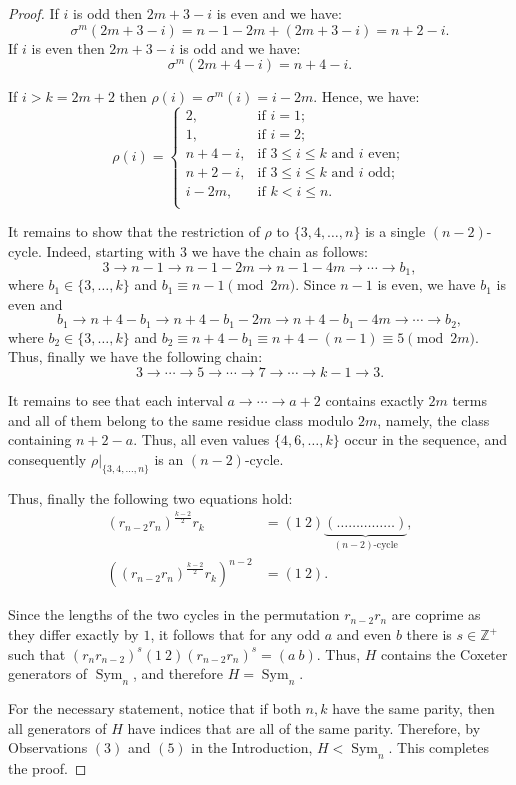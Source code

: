\documentclass[
final
]{dmtcs-episciences}
\DeclareMathOperator{\Sym}{\mathrm{Sym}}
\begin{document}
\begin{proof}
If $i$ is odd then $2m+3-i$ is even and we have: 
\[
\sigma^{m}(2m+3-i) = n-1 - 2m + (2m+3-i) = n + 2 - i.
\]
If $i$ is even then $2m+3-i$ is odd and we have: 
\[
\sigma^{m}(2m+4-i) = n + 4 - i.     
\]

If $i > k = 2m+2$ then $\rho(i) = \sigma^{m}(i) = i - 2m$. Hence, we have:
\[
\rho(i)=
\begin{cases}
	2, & \text{if }i=1;\\
	1, & \text{if }i=2;\\
	n+4 - i, & \text{if }3\leqslant i\leqslant k \mbox{ and } i \text{ even};\\
	n+2 - i, & \text{if }3\leqslant i\leqslant k \mbox{ and } i \text{ odd};\\
	i - 2m, & \text{if }k < i\leqslant n.\\
\end{cases}
\]

It remains to show that the restriction of $\rho$ to $\{3,4,\dots,n\}$ is a single $(n-2)$-cycle. Indeed, starting with $3$ we have the chain as follows:
\[
3 \rightarrow n-1 \rightarrow n-1-2m \rightarrow n-1-4m \rightarrow \cdots \rightarrow b_1, 
\]
where $b_1 \in \{3, \dots, k\}$ and $b_1 \equiv n-1 \pmod{2m}$. Since $n-1$ is even, we have $b_1$ is even and  
\[
b_1 \rightarrow n+4-b_1 \rightarrow n+4-b_1-2m \rightarrow n+4-b_1-4m \rightarrow \cdots \rightarrow b_2, 
\] 
where $b_2 \in \{3, \dots, k\}$ and $b_2 \equiv n + 4-b_1 \equiv  n + 4 -(n-1) \equiv 5 \pmod{2m}$. Thus, finally we have the following chain:
\[
3 \rightarrow \cdots \rightarrow 5 \rightarrow \cdots \rightarrow 7 \rightarrow \cdots \rightarrow k-1 \rightarrow 3.
\]

It remains to see that each interval $a \rightarrow \cdots \rightarrow a+2$ contains exactly $2m$ terms and all of them belong to the same residue class modulo $2m$, namely, the class containing $n+2-a$. Thus, all even values $\{4,6,\dots,k\}$ occur in the sequence, and consequently $\rho|_{\{3,4,\dots,n\}}$ is an $(n-2)$-cycle.

Thus, finally the following two equations hold: 
\begin{align*}
(r_{n-2}r_{n})^{\frac{k-2}{2}}r_k &= (1\ 2) \underbrace{(\dots \ldots \ldots \ldots \ldots)}_{(n-2)\text{-cycle}}, \\
((r_{n-2}r_{n})^{\frac{k-2}{2}}r_k)^{n-2} &=(1\ 2).
\end{align*}

Since the lengths of the two cycles in the permutation $r_{n-2}r_n$ are coprime as they differ exactly by $1$, it follows that for any odd $a$ and even $b$ there is $s \in \mathbb{Z}^+$ such that $(r_{n}r_{n-2})^{s} (1\ 2)(r_{n-2}r_{n})^{s} = (a\ b)$. Thus, $H$ contains the Coxeter generators of $\Sym_n$, and therefore $H = \Sym_n$.

For the necessary statement, notice that if both $n,k$ have the same parity, then all generators of $H$ have indices that are all of the same parity. Therefore, by Observations $(3)$ and $(5)$ in the Introduction, $H<\Sym_n$. This completes the proof. 
\end{proof}
\end{document}
